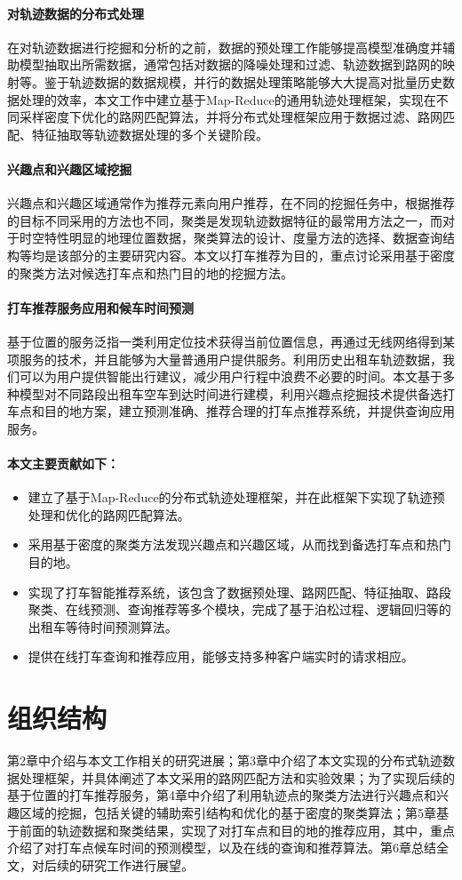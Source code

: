 \paragraph{对轨迹数据的分布式处理} 

在对轨迹数据进行挖掘和分析的之前，数据的预处理工作能够提高模型准确度并辅助模型抽取出所需数据，通常包括对数据的降噪处理和过滤、轨迹数据到路网的映射等。鉴于轨迹数据的数据规模，并行的数据处理策略能够大大提高对批量历史数据处理的效率，本文工作中建立基于Map-Reduce的通用轨迹处理框架，实现在不同采样密度下优化的路网匹配算法，并将分布式处理框架应用于数据过滤、路网匹配、特征抽取等轨迹数据处理的多个关键阶段。

\paragraph{兴趣点和兴趣区域挖掘}

兴趣点和兴趣区域通常作为推荐元素向用户推荐，在不同的挖掘任务中，根据推荐的目标不同采用的方法也不同，聚类是发现轨迹数据特征的最常用方法之一，而对于时空特性明显的地理位置数据，聚类算法的设计、度量方法的选择、数据查询结构等均是该部分的主要研究内容。本文以打车推荐为目的，重点讨论采用基于密度的聚类方法对候选打车点和热门目的地的挖掘方法。

\paragraph{打车推荐服务应用和候车时间预测}

基于位置的服务泛指一类利用定位技术获得当前位置信息，再通过无线网络得到某项服务的技术\cite{ayzhou_lba}，并且能够为大量普通用户提供服务。利用历史出租车轨迹数据，我们可以为用户提供智能出行建议，减少用户行程中浪费不必要的时间。本文基于多种模型对不同路段出租车空车到达时间进行建模，利用兴趣点挖掘技术提供备选打车点和目的地方案，建立预测准确、推荐合理的打车点推荐系统，并提供查询应用服务。


\paragraph{本文主要贡献如下：}

\begin{itemize}
	\item 建立了基于Map-Reduce的分布式轨迹处理框架，并在此框架下实现了轨迹预处理和优化的路网匹配算法。
	\item 采用基于密度的聚类方法发现兴趣点和兴趣区域，从而找到备选打车点和热门目的地。
	\item 实现了打车智能推荐系统，该包含了数据预处理、路网匹配、特征抽取、路段聚类、在线预测、查询推荐等多个模块，完成了基于泊松过程、逻辑回归等的出租车等待时间预测算法。
	\item 提供在线打车查询和推荐应用，能够支持多种客户端实时的请求相应。
\end{itemize}


\section{组织结构}

第2章中介绍与本文工作相关的研究进展；第3章中介绍了本文实现的分布式轨迹数据处理框架，并具体阐述了本文采用的路网匹配方法和实验效果；为了实现后续的基于位置的打车推荐服务，第4章中介绍了利用轨迹点的聚类方法进行兴趣点和兴趣区域的挖掘，包括关键的辅助索引结构和优化的基于密度的聚类算法；第5章基于前面的轨迹数据和聚类结果，实现了对打车点和目的地的推荐应用，其中，重点介绍了对打车点候车时间的预测模型，以及在线的查询和推荐算法。第6章总结全文，对后续的研究工作进行展望。



